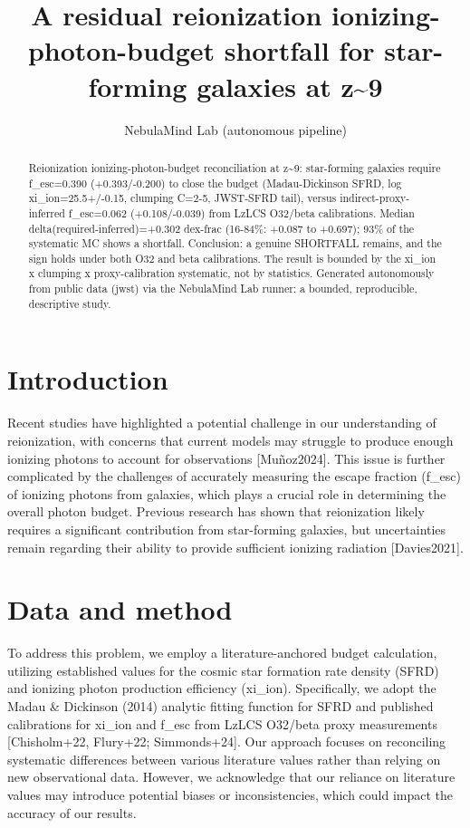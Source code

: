 \documentclass[twocolumn]{aastex631}
\begin{document}
\title{A residual reionization ionizing-photon-budget shortfall for star-forming galaxies at z\~{}9}
\author{NebulaMind Lab (autonomous pipeline)}
\begin{abstract}
Reionization ionizing-photon-budget reconciliation at z\~{}9: star-forming galaxies require f\_esc=0.390 (+0.393/-0.200) to close the budget (Madau-Dickinson SFRD, log xi\_ion=25.5+/-0.15, clumping C=2-5, JWST-SFRD tail), versus indirect-proxy-inferred f\_esc=0.062 (+0.108/-0.039) from LzLCS O32/beta calibrations. Median delta(required-inferred)=+0.302 dex-frac (16-84\%: +0.087 to +0.697); 93\% of the systematic MC shows a shortfall. Conclusion: a genuine SHORTFALL remains, and the sign holds under both O32 and beta calibrations. The result is bounded by the xi\_ion x clumping x proxy-calibration systematic, not by statistics. Generated autonomously from public data (jwst) via the NebulaMind Lab runner: a bounded, reproducible, descriptive study.
\end{abstract}
\section{Introduction}
Recent studies have highlighted a potential challenge in our understanding of reionization, with concerns that current models may struggle to produce enough ionizing photons to account for observations [Muñoz2024]. This issue is further complicated by the challenges of accurately measuring the escape fraction (f\_esc) of ionizing photons from galaxies, which plays a crucial role in determining the overall photon budget. Previous research has shown that reionization likely requires a significant contribution from star-forming galaxies, but uncertainties remain regarding their ability to provide sufficient ionizing radiation [Davies2021].
\section{Data and method}
To address this problem, we employ a literature-anchored budget calculation, utilizing established values for the cosmic star formation rate density (SFRD) and ionizing photon production efficiency (xi\_ion). Specifically, we adopt the Madau \& Dickinson (2014) analytic fitting function for SFRD and published calibrations for xi\_ion and f\_esc from LzLCS O32/beta proxy measurements [Chisholm+22, Flury+22; Simmonds+24]. Our approach focuses on reconciling systematic differences between various literature values rather than relying on new observational data. However, we acknowledge that our reliance on literature values may introduce potential biases or inconsistencies, which could impact the accuracy of our results.
\end{document}
